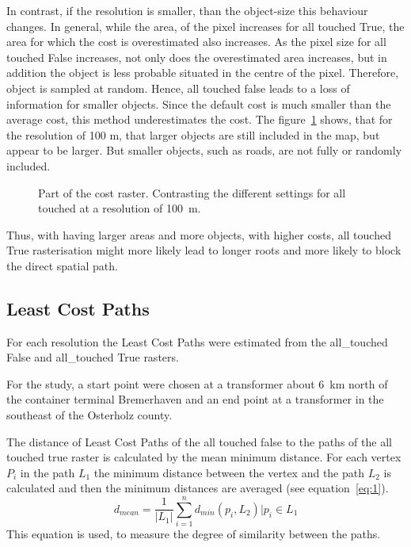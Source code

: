 In contrast, if the resolution is smaller, than the object-size this behaviour changes.
In general, while the area, of the pixel increases for all touched True, the area for which the cost is overestimated also increases.
As the pixel size for all touched  False increases, not only does the overestimated area increases, but in addition the object is less probable situated in the centre of the pixel. 
Therefore, object is sampled at random.
Hence, all touched false leads to a loss of information for smaller objects.
 Since the default cost is much smaller than the average cost, this method underestimates the cost.
The figure~\ref{fig:costs_100m} shows, that for the resolution of 100 m, that larger objects are still included in the map, but appear to be larger.
But smaller objects, such as roads, are not fully or randomly included.
\begin{figure}
	\centering

	\qquad
	\caption{Part of the cost raster. Contrasting the different settings for all touched at a resolution of 100~m.}
	\label{fig:costs_100m}
\end{figure}
Thus, with having larger areas and more objects, with higher costs, all touched True rasterisation might more likely lead to longer roots and more likely to block the  direct spatial path.

\subsection{Least Cost Paths}\label{subsec:least-cost-paths}
For each resolution the Least Cost Paths were estimated from the all\_touched False and all\_touched True rasters.

For the study, a start point were chosen at a transformer about 6~km north of the container terminal Bremerhaven and an end point at a transformer in the southeast of the Osterholz county. 

The distance of Least Cost Paths of the all touched false to the paths of the all touched true raster is calculated by the mean minimum distance.
For each vertex $P_i$ in the path $L_1$ the minimum distance between the vertex and the path $L_2$
is calculated and then the minimum distances are averaged (see equation~\ref{eq:1}).
\begin{equation}
	\label{eq:1}
	d_{mean} = \frac{1}{|L_1|} \sum_{i=1}^{n} d_{min}(p_i, L_2) \Bigr\vert p_i \in L_1
\end{equation}
This equation is used, to measure the degree of similarity between the paths.

